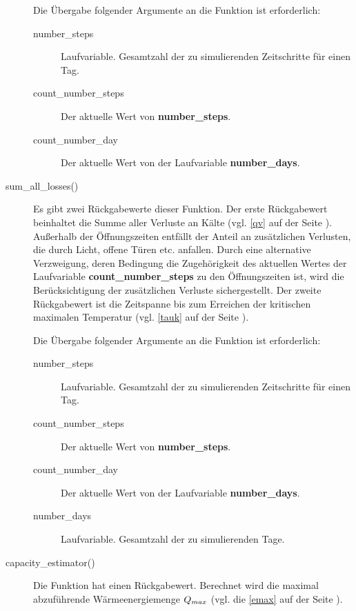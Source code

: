 \begin{description}
	Die \"Ubergabe folgender Argumente an die Funktion ist erforderlich:
	\begin{description}
		\item[number\_steps] Laufvariable. Gesamtzahl der zu
		simulierenden Zeitschritte f\"ur einen Tag.
		\item[count\_number\_steps] Der aktuelle Wert von
		\textbf{number\_steps}.
		\item[count\_number\_day] Der aktuelle Wert von der Laufvariable
		\textbf{number\_days}.
	\end{description}

	\item[sum\_all\_losses()] Es gibt zwei R\"uckgabewerte dieser Funktion.
	Der erste R\"uckgabewert beinhaltet die Summe aller Verluste an K\"alte
	(vgl. \cref{qv} auf der Seite \pageref{qv}).
	Au\ss erhalb der \"Offnungszeiten entf\"allt der Anteil an
	zus\"atzlichen Verlusten, die durch Licht, offene T\"uren etc.
	anfallen. Durch eine alternative Verzweigung, deren Bedingung die
	Zugeh\"origkeit des aktuellen Wertes der Laufvariable
	\textbf{count\_number\_steps} zu den \"Offnungszeiten ist, wird die
	Ber\"ucksichtigung der zus\"atzlichen Verluste sichergestellt. Der
	zweite R\"uckgabewert ist die Zeitspanne bis zum Erreichen der
	kritischen maximalen Temperatur (vgl. \cref{tauk} auf der Seite
	\pageref{tauk}).

	Die \"Ubergabe folgender Argumente an die Funktion ist erforderlich:
	\begin{description}
		\item[number\_steps] Laufvariable. Gesamtzahl der zu
		simulierenden Zeitschritte f\"ur einen Tag.
		\item[count\_number\_steps] Der aktuelle Wert von
		\textbf{number\_steps}.
		\item[count\_number\_day] Der aktuelle Wert von der Laufvariable
		\textbf{number\_days}.
		\item[number\_days] Laufvariable. Gesamtzahl der zu
		simulierenden Tage.
	\end{description}

	\item[capacity\_estimator()] Die Funktion hat einen R\"uckgabewert.
	Berechnet wird die maximal abzuf\"uhrende W\"armeenergiemenge $Q_{max}$
	(vgl. die \cref{emax} auf der Seite \pageref{emax}).


\end{description}
